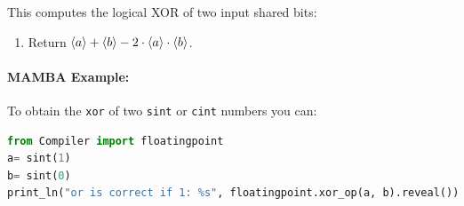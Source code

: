 This computes the logical XOR of two input shared bits:
\begin{enumerate}
\item Return $\langle a \rangle+\langle b \rangle-2 \cdot \langle a \rangle \cdot \langle b \rangle$.
\end{enumerate}
\paragraph{MAMBA Example:} To obtain the \verb|xor| of two \verb|sint| or \verb|cint| numbers you can: 
\begin{lstlisting}[language={python}]
from Compiler import floatingpoint
a= sint(1)
b= sint(0)
print_ln("or is correct if 1: %s", floatingpoint.xor_op(a, b).reveal())
\end{lstlisting}

\iffalse
\note{Nigel}{Does not seem to be used anywhere}
\msubsubsection{$\mathsf{Symm}(f,\sshare{a_1},\ldots,\sshare{a_t})$:}
This takes a symmetric boolean function $f$ on $t$ binary inputs
and evaluates it at the points $\sshare{a_1},\ldots,\sshare{a_t}$,
where we assume $a_i \in \{0,1\}$.
We first pre-process the function $f$ so that we can write
\[ f(x_1,\ldots,x_t) = \phi(1+\sum_{i=1}^t x_i), \]
where the inner sum is over the integers and
$\phi:{1,2,\ldots,t+1} \longrightarrow \{0,1\}$.
We then write
\[ \phi(X) = \sum_{i=0}^t \alpha_i \cdot X^i \pmod{p} \]
using Lagrange interpolation.
So for example if we have $f(X_1,X_2)=X_1^2+X_1 \cdot X_2+X_2^2+1$
then $\phi$ is the function which maps 
$1 \longrightarrow 1$, $2 \longrightarrow 0$, $3 \longrightarrow 0$.
In which case $\phi(X)=X^2/2-5 \cdot X/2+3$.

To compute this function we have the algorithm
\begin{enumerate}
\item $\sshare{a} \asn 1+ \sum_{i=1}^t \sshare{a_i}$.
\item $(\sshare{a},\sshare{a^2},\ldots,\sshare{a^t})
	\asn \mathsf{PreMult}(\sshare{a},\ldots,\sshare{a},
			\{(1,1),\ldots,(1,t)\})$.
\item $\sshare{f(a_1,\ldots,a_t)}
	\asn \sum_{i=0}^t \alpha_i \cdot \sshare{a^i}$.
\end{enumerate}
\fi

